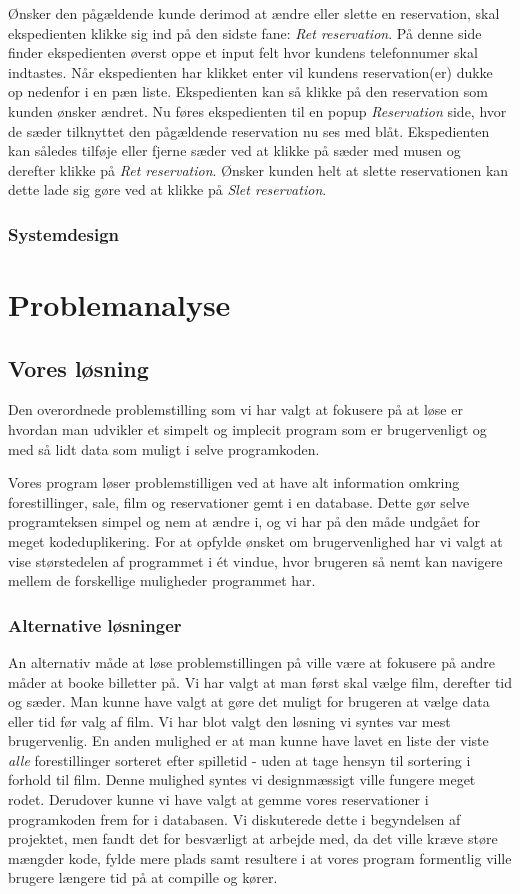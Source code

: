 \documentclass[final]{rapport1}
\begin{document}
Ønsker den pågældende kunde derimod at ændre eller slette en reservation, skal ekspedienten klikke sig ind på den sidste fane: \emph{Ret reservation}. På denne side finder ekspedienten øverst oppe et input felt hvor kundens telefonnumer skal indtastes. Når ekspedienten har klikket enter vil kundens reservation(er) dukke op nedenfor i en pæn liste. Ekspedienten kan så klikke på den reservation som kunden ønsker ændret. Nu føres ekspedienten til en popup \emph{Reservation} side, hvor de sæder tilknyttet den pågældende reservation nu ses med blåt. Ekspedienten kan således tilføje eller fjerne sæder ved at klikke på sæder med musen og derefter klikke på \emph{Ret reservation}. Ønsker kunden helt at slette reservationen kan dette lade sig gøre ved at klikke på \emph{Slet reservation}. 

\subsection{Systemdesign}



\chapter{Problemanalyse}
\section{Vores løsning}
Den overordnede problemstilling som vi har valgt at fokusere på at løse er hvordan man udvikler et simpelt og implecit program som er brugervenligt og med så lidt data som muligt i selve programkoden.


Vores program løser problemstilligen ved at have alt information omkring forestillinger, sale, film og reservationer gemt i en database. Dette gør selve programteksen simpel og nem at ændre i, og vi har på den måde undgået for meget kodeduplikering. For at opfylde ønsket om brugervenlighed har vi valgt at vise størstedelen af programmet i ét vindue, hvor brugeren så nemt kan navigere mellem de forskellige muligheder programmet har. 


\subsection{Alternative løsninger}
An alternativ måde at løse problemstillingen på ville være at fokusere på andre måder at booke billetter på. Vi har valgt at man først skal vælge film, derefter tid og sæder. Man kunne have valgt at gøre det muligt for brugeren at vælge data eller tid før valg af film. Vi har blot valgt den løsning vi syntes var mest brugervenlig. En anden mulighed er at man kunne have lavet en liste der viste \emph{alle} forestillinger sorteret efter spilletid - uden at tage hensyn til sortering i forhold til film. Denne mulighed syntes vi designmæssigt ville fungere meget rodet. Derudover kunne vi have valgt at gemme vores reservationer i programkoden frem for i databasen. Vi diskuterede dette i begyndelsen af projektet, men fandt det for besværligt at arbejde med, da det ville kræve støre mængder kode, fylde mere plads samt resultere i at vores program formentlig ville brugere længere tid på at compille og kører. 
\end{document}
